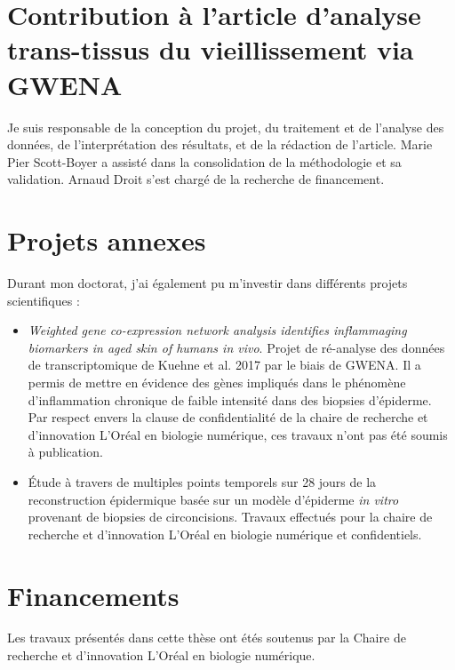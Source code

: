 \section{Contribution à l'article d'analyse trans-tissus du vieillissement via GWENA}

Je suis responsable de la conception du projet, du traitement et de l'analyse des données, de l'interprétation des résultats, et de la rédaction de l'article. Marie Pier Scott-Boyer a assisté dans la consolidation de la méthodologie et sa validation. Arnaud Droit s'est chargé de la recherche de financement.


\section{Projets annexes}

Durant mon doctorat, j'ai également pu m'investir dans différents projets scientifiques :
\begin{itemize}
    \item \textit{Weighted gene co-expression network analysis identifies inflammaging biomarkers in aged skin of humans in vivo}. Projet de ré-analyse des données de transcriptomique de Kuehne et al. 2017 par le biais de GWENA. Il a permis de mettre en évidence des gènes impliqués dans le phénomène d'inflammation chronique de faible intensité dans des biopsies d'épiderme. Par respect envers la clause de confidentialité de la chaire de recherche et d'innovation L'Oréal en biologie numérique, ces travaux n'ont pas été soumis à publication.
    \item Étude à travers de multiples points temporels sur 28 jours de la reconstruction épidermique basée sur un modèle d'épiderme \textit{in vitro} provenant de biopsies de circoncisions. Travaux effectués pour la chaire de recherche et d'innovation L'Oréal en biologie numérique et confidentiels.
\end{itemize}




\section{Financements}

Les travaux présentés dans cette thèse ont étés soutenus par la Chaire de recherche et d'innovation L'Oréal en biologie numérique.

